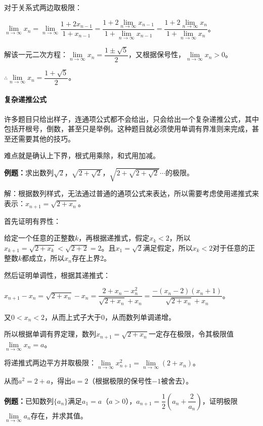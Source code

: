 对于关系式两边取极限：

$\lim\limits_{n\to\infty}x_n=\lim\limits_{n\to\infty}\dfrac{1+2x_{n-1}}{1+x_{n-1}}=\dfrac{1+2\lim\limits_{n\to\infty}x_{n-1}}{1+\lim\limits_{n\to\infty}x_{n-1}}=\dfrac{1+2\lim\limits_{n\to\infty}x_n}{1+\lim\limits_{n\to\infty}x_n}$。

解该一元二次方程：$\lim\limits_{n\to\infty}x_n=\dfrac{1\pm\sqrt{5}}{2}$，又根据保号性，$\lim\limits_{n\to\infty}x_n>0$。

$\therefore\lim\limits_{n\to\infty}x_n=\dfrac{1+\sqrt{5}}{2}$。

\paragraph{复杂递推公式} \leavevmode \medskip

许多题目只给出样子，连通项公式都不会给出，只会给出一个复杂递推公式，其中包括开根号，倒数，甚至只是举例。这种题目就必须使用单调有界准则来完成，甚至还需要其他的技巧。\medskip

难点就是确认上下界，根式用乘除，和式用加减。

\textbf{例题：}求出数列$\sqrt{2}$，$\sqrt{2+\sqrt{2}}$，$\sqrt{2+\sqrt{2+\sqrt{2}}}$$\cdots$的极限。

解：根据数列样式，无法通过普通的通项公式来表达，所以需要考虑使用递推式来表示：$x_{n+1}=\sqrt{2+x_n}$。

首先证明有界性：

给定一个任意的正整数$k$，再根据递推式，假定$x_k<2$，所以$x_{k+1}=\sqrt{2+x_k}<\sqrt{2+2}=2$。且$x_1=\sqrt{2}$满足假定，所以$x_k<2$对于任意的正整数$k$都成立，所以$x_n$存在上界2。

然后证明单调性，根据其递推式：

$x_{n+1}-x_n=\sqrt{2+x_n}-x_n=\dfrac{2+x_n-x_n^2}{\sqrt{2+x_n}+x_n}=\dfrac{-(x_n-2)(x_n+1)}{\sqrt{2+x_n}+x_n}$。\medskip

又$0<x_n<2$，从而上式子大于0，从而数列单调递增。

所以根据单调有界定理，数列$x_{n+1}=\sqrt{2+x_n}$一定存在极限，令其极限值$\lim\limits_{n\to\infty}x_n=a$。

将递推式两边平方并取极限：$\lim\limits_{n\to\infty}x^2_{n+1}=\lim\limits_{n\to\infty}(2+x_n)$。

从而$a^2=2+a$，得出$a=2$（根据极限的保号性$-1$被舍去）。

\textbf{例题：}已知数列$\{a_n\}$满足$a_1=a$（$a>0$），$a_{n+1}=\dfrac{1}{2}\left(a_n+\dfrac{2}{a_n}\right)$，证明极限$\lim\limits_{n\to\infty}a_n$存在，并求其值。

